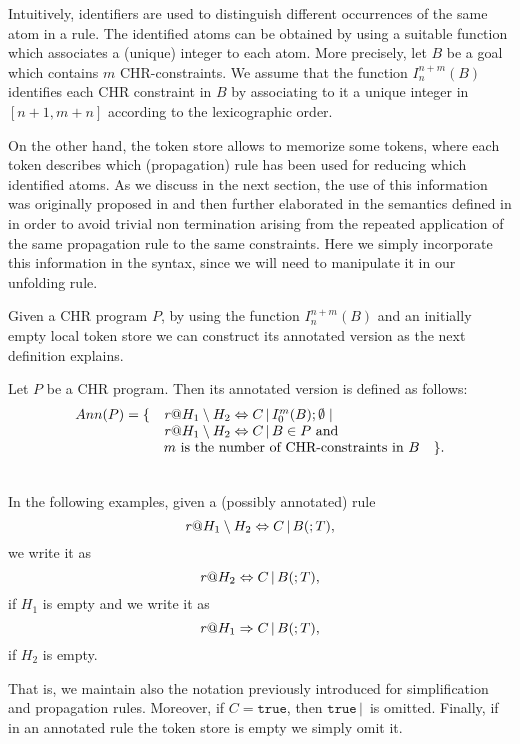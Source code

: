 \documentclass[final]{acmtrans2e}
\begin{document}
Intuitively, identifiers are used to distinguish different
occurrences of the same atom in a rule. The identified atoms can
be obtained by using a suitable function which associates a
(unique) integer to each atom. More precisely, let $B$ be a goal
which contains $m$ CHR-constraints. We assume that the function
$I_n ^{n+m}(B)$ identifies each CHR constraint in $B$ by
associating to it a unique integer in $[n+1,m+n]$ according to the
lexicographic order.

On the other hand, the token store allows to memorize  some tokens,
where each token describes which (propagation) rule has been used
for reducing which identified atoms.
As we discuss
in the next section, the use of this information was originally proposed
in \cite{Abd97} and then further elaborated in the semantics defined
in \cite{DSGH04} in order to avoid trivial  non termination
arising from the repeated application of the same propagation rule
to the same constraints. Here we simply incorporate this
information in the syntax, since we will need to manipulate it in
our unfolding rule.

Given a CHR program $P$, by using the function $I_n ^{n+m}(B)$ and
an initially empty local token store we can construct its annotated
version as the next definition explains.


\begin{definition}
Let $P$ be a CHR program. Then its annotated version is defined as follows:
\[\begin{array}{lll}
  Ann(P)=\{&{\it r}@ H_1 \setminus H_2 \Leftrightarrow C  \,|\,  I_0
^{m}(B);\emptyset \mid& \\
& {\it r}@ H_1 \setminus H_2 \Leftrightarrow C
 \,|\,
B \in P \mbox{ and } &\\
&\mbox{$m$ is the number of CHR-constraints in $B$}&\}.
\end{array}
\]
\end{definition}


 \\
In the following examples, given a
(possibly annotated) rule
$${\it r}@ H_1 \setminus
H_2 \Leftrightarrow C  \,|\,  B(;T),$$   we write it as
$${\it r}@ H_2 \Leftrightarrow C  \,|\,  B(;T),$$ if $H_1$ is empty and
we write it as
$${\it r}@ H_1 \Rightarrow C  \,|\,  B(;T),$$ if $H_2$ is empty.

That is, we maintain also the notation previously introduced for
simplification and propagation rules. Moreover, if $C=
\texttt{true}$, then $\texttt{true}  \,|\, $ is omitted.
Finally,  if in an annotated rule the token store is empty we
simply  omit it.
\end{document}
